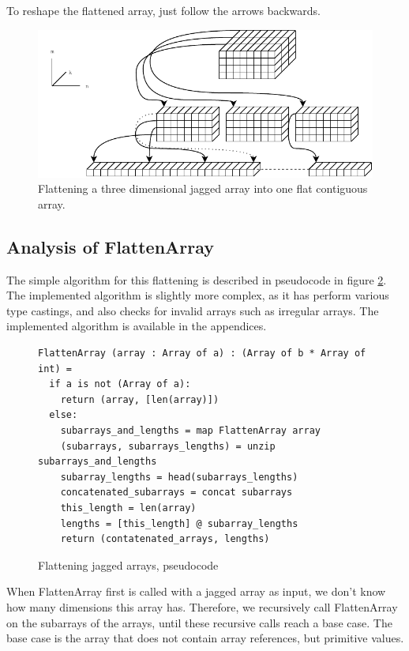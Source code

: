 To reshape the flattened array, just follow the arrows backwards.

\begin{figure}[H]
  \centering
  \includegraphics[scale=1.4, angle=270]{chapters/figs/jaggedtoflat.pdf}
  \caption{Flattening a three dimensional jagged array into one flat contiguous
    array.}
  \label{fig:jaggedtoflat}
\end{figure}



\clearpage
\subsection{Analysis of FlattenArray}
The simple algorithm for this flattening is described in pseudocode in figure
\ref{fig:flattenarray}. The implemented algorithm is slightly more complex, as
it has perform various type castings, and also checks for invalid arrays such as
irregular arrays.
The implemented algorithm is available in the appendices.

\begin{figure}[h]
  \centering
\begin{verbatim}
FlattenArray (array : Array of a) : (Array of b * Array of int) =
  if a is not (Array of a):
    return (array, [len(array)])
  else:
    subarrays_and_lengths = map FlattenArray array
    (subarrays, subarrays_lengths) = unzip subarrays_and_lengths
    subarray_lengths = head(subarrays_lengths)
    concatenated_subarrays = concat subarrays
    this_length = len(array)
    lengths = [this_length] @ subarray_lengths
    return (contatenated_arrays, lengths)
\end{verbatim}
  \caption{Flattening jagged arrays, pseudocode}
  \label{fig:flattenarray}
\end{figure}

When FlattenArray first is called with a jagged array as input, we don't know
how many dimensions this array has. Therefore, we recursively call FlattenArray
on the subarrays of the arrays, until these recursive calls reach a base case.
The base case is the array that does not contain array references, but primitive
values.


